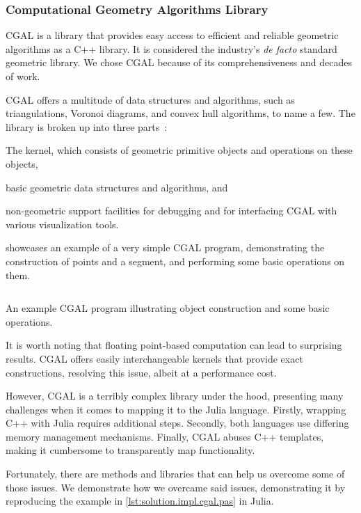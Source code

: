 \subsubsection{Computational Geometry Algorithms Library}%
\label{sec:solution.impl.cgal}

\Ac{CGAL} is a library that provides easy access to efficient and reliable
geometric algorithms as a C++ library.  It is considered the industry's
\textit{de facto} standard geometric library.  We chose \ac{CGAL} because of its
comprehensiveness and decades of work.

\ac{CGAL} offers a multitude of data structures and algorithms, such as
triangulations, Voronoi diagrams, and convex hull algorithms, to name a few.
The library is broken up into three parts~\cite{CGAL:5.3:23LGK}:
\begin{enumerate*}
  \item The kernel, which consists of geometric primitive objects and operations
  on these objects,
  \item basic geometric data structures and algorithms, and
  \item non-geometric support facilities for debugging and for interfacing
  \ac{CGAL} with various visualization tools.
\end{enumerate*}

 showcases an example of a very simple
\ac{CGAL} program, demonstrating the construction of points and a segment, and
performing some basic operations on them.

\begin{listing}[htbp]
  \inputminted{cpp}{cpp/points_and_segments.cpp}
  \caption[CGAL: Three points and one segment]{
    An example CGAL program illustrating object construction and some
    basic operations.}\label{lst:solution.impl.cgal.pas}
\end{listing}

It is worth noting that floating point-based computation can lead to surprising
results.  \Ac{CGAL} offers easily interchangeable kernels that provide
exact constructions, resolving this issue, albeit at a performance cost.

However, \ac{CGAL} is a terribly complex library under the hood, presenting many
challenges when it comes to mapping it to the Julia language.  Firstly, wrapping
C++ with Julia requires additional steps.  Secondly, both languages use differing
memory management mechanisms.  Finally, \ac{CGAL} abuses C++ templates, making
it cumbersome to transparently map functionality.

Fortunately, there are methods and libraries that can help us overcome some of
those issues.  We demonstrate how we overcame said issues, demonstrating it by
reproducing the example in \cref{lst:solution.impl.cgal.pas} in Julia.
